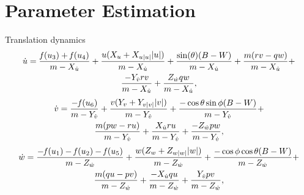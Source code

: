 \documentclass[11pt]{beamer}
\begin{document}
\section{Parameter Estimation}
\begin{frame}[shrink]{Translation dynamics}
\begin{multline} \label{eq:u_dot}
\dot{u} = \frac{\mathit{f}(u_{3}) + \mathit{f}(u_{4})}{m -X_{\dot{u}}} + \frac{u (X_{u} + X_{u|u|} |u|)}{m -X_{\dot{u}}} + \frac{\sin(\theta)(B - W)}{m -X_{\dot{u}}} +
\frac{m(r v - q w )}{m -X_{\dot{u}}} + \\ \frac{-Y_{\dot{v}} r v}{m -X_{\dot{u}}} + \frac{Z_{\dot{w}} q w}{m -X_{\dot{u}}},
\end{multline}
\begin{multline} \label{eq:v_dot}
\dot{v} = \frac{-\mathit{f}(u_{6})}{m - Y_{\dot{v}}} + \frac{v (Y_{v} + Y_{v|v|} |v|)}{m - Y_{\dot{v}}} + \frac{-\cos{\theta} \sin{\phi}(B - W)}{m - Y_{\dot{v}}} +\\ \frac{m(p w - r u)}{m - Y_{\dot{v}}} + \frac{X_{\dot{u}} r u}{m - Y_{\dot{v}}} + \frac{-Z_{\dot{w}} p w}{m - Y_{\dot{v}}},
\end{multline}
\begin{multline} \label{eq:w_dot}
\dot{w} = \frac{-\mathit{f}(u_{1}) - \mathit{f}(u_{2}) - \mathit{f}(u_{5})}{m - Z_{\dot{w}}} + \frac{w (Z_{w} + Z_{w|w|} |w|)}{m - Z_{\dot{w}}} + \frac{-\cos{\phi}\cos{\theta}(B - W)}{m - Z_{\dot{w}}} +\\
\frac{m (q u - p v)}{m - Z_{\dot{w}}} + \frac{-X_{\dot{u}} q u}{m - Z_{\dot{w}}} + \frac{Y_{\dot{v}} p v}{m - Z_{\dot{w}}},
\end{multline}
\end{frame}
\end{document}
